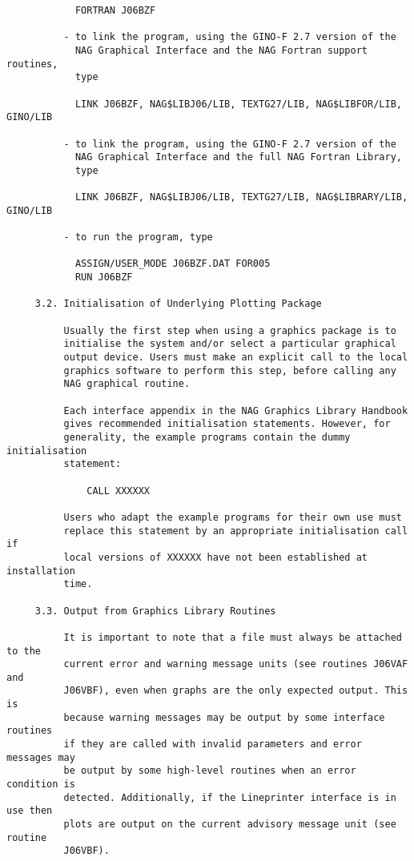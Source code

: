 \begin{verbatim}
            FORTRAN J06BZF
     
          - to link the program, using the GINO-F 2.7 version of the 
            NAG Graphical Interface and the NAG Fortran support routines,
            type
     
            LINK J06BZF, NAG$LIBJ06/LIB, TEXTG27/LIB, NAG$LIBFOR/LIB, GINO/LIB

          - to link the program, using the GINO-F 2.7 version of the
            NAG Graphical Interface and the full NAG Fortran Library,
            type
     
            LINK J06BZF, NAG$LIBJ06/LIB, TEXTG27/LIB, NAG$LIBRARY/LIB, GINO/LIB
     
          - to run the program, type
     
            ASSIGN/USER_MODE J06BZF.DAT FOR005
            RUN J06BZF
     
     3.2. Initialisation of Underlying Plotting Package
     
          Usually the first step when using a graphics package is to
          initialise the system and/or select a particular graphical
          output device. Users must make an explicit call to the local
          graphics software to perform this step, before calling any
          NAG graphical routine.

          Each interface appendix in the NAG Graphics Library Handbook
          gives recommended initialisation statements. However, for
          generality, the example programs contain the dummy initialisation
          statement:
     
              CALL XXXXXX
     
          Users who adapt the example programs for their own use must
          replace this statement by an appropriate initialisation call if
          local versions of XXXXXX have not been established at installation
          time.
     
     3.3. Output from Graphics Library Routines
     
          It is important to note that a file must always be attached to the
          current error and warning message units (see routines J06VAF and
          J06VBF), even when graphs are the only expected output. This is
          because warning messages may be output by some interface routines
          if they are called with invalid parameters and error messages may
          be output by some high-level routines when an error condition is
          detected. Additionally, if the Lineprinter interface is in use then
          plots are output on the current advisory message unit (see routine
          J06VBF).
     

\end{verbatim}
